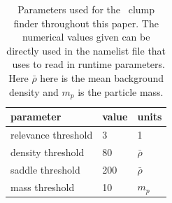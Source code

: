 \begin{table}
\centering
\caption{Parameters used for the \phew\ clump finder throughout this
  paper.  The numerical values given can be directly used in the
  namelist file that \ramses\ uses to read in runtime parameters.
  Here $\bar \rho$ here is the mean background density and $m_p$ is
  the particle mass.}
\label{tab:phew-parameters}
\begin{tabular}[c]{l l l}
  parameter				&	value		& units \\
  \hline
  relevance threshold			&	3		& 1		\\
  density threshold			& 80			& $\bar \rho$ 	\\
  saddle threshold			& 200			& $\bar \rho$	\\
  mass threshold			& 10			& $m_p$		\\
  \hline
\end{tabular}
\end{table}
 
	

